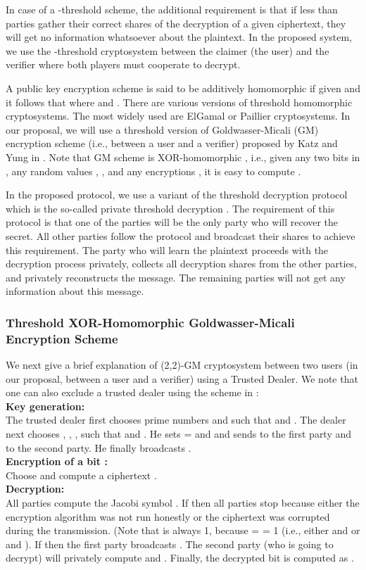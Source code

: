 \documentclass[journal]{IEEEtran}
\begin{document}
In case of a -threshold scheme, the additional requirement is that if less than  parties gather their correct shares of the decryption of a given ciphertext, they will get no information whatsoever about the plaintext. In the proposed system, we use the -threshold cryptosystem between the claimer (the user) and the verifier where both players must cooperate to decrypt. 

A public key encryption scheme is said to be additively homomorphic if given  and  it follows that  where  and . There are various versions of threshold homomorphic cryptosystems. The most widely used are ElGamal \cite{Elgamal} or Paillier \cite{Paillier} cryptosystems. In our proposal, we will use a threshold version of Goldwasser-Micali (GM) encryption scheme (i.e., between a user and a verifier) proposed by Katz and Yung in \cite{KY02}. Note that GM scheme is XOR-homomorphic \cite{GM84}, i.e., given any two bits  in , any random values ,    , and any encryptions , it is easy to compute . 

In the proposed protocol, we use a variant of the threshold decryption protocol which is the so-called private threshold decryption \cite{Damgard}. The requirement of this protocol is that one of the  parties will be the only party who will recover the secret. All  other parties follow the protocol and broadcast their shares to achieve this requirement. The party who will learn the plaintext proceeds with the decryption process privately, collects all decryption shares from the  other parties, and privately reconstructs the message. The remaining parties will not get any information about this message.

\subsubsection{Threshold XOR-Homomorphic Goldwasser-Micali Encryption Scheme}
We next give a brief explanation of (2,2)-GM cryptosystem between two users (in our proposal, between a user and a verifier) using a Trusted Dealer. We note that one can also exclude a trusted dealer using the scheme in \cite{KY02}:\\
\textbf{Key generation:}\\
The trusted dealer first chooses prime numbers  and   such that  and      . The dealer next chooses , , ,    such that  and . He sets  =  and    and sends  to the first party and  to the second party. He finally broadcasts .\\
\textbf{Encryption of a bit   :}\\
Choose    and compute a ciphertext .\\
\textbf{Decryption:}\\
All parties compute the Jacobi symbol . If  then all parties stop because either the encryption algorithm was not run honestly or the ciphertext was corrupted during the transmission. (Note that  is always 1, because  =  = 1 (i.e., either  and  or  and ). If  then the first party broadcasts . The second party (who is going to decrypt) will privately compute  and . Finally, the decrypted bit  is computed as . 
\end{document}
